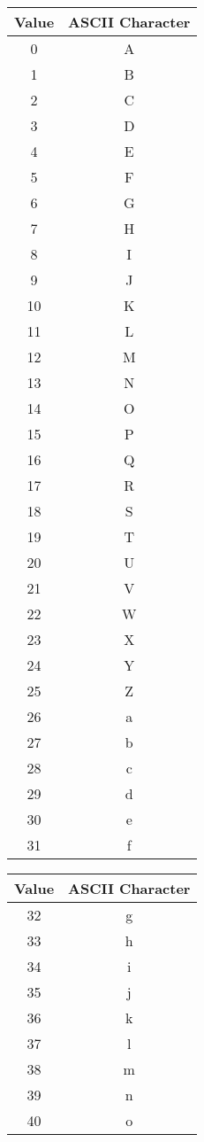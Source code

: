 \documentclass[12pt]{book}
\begin{document}
  {\ttfamily\begin{tabular}{c c}
    \hline
    Value & ASCII Character \\
    \hline
     0 & A \\
     1 & B \\
     2 & C \\
     3 & D \\
     4 & E \\
     5 & F \\
     6 & G \\
     7 & H \\
     8 & I \\
     9 & J \\
    10 & K \\
    11 & L \\
    12 & M \\
    13 & N \\
    14 & O \\
    15 & P \\
    16 & Q \\
    17 & R \\
    18 & S \\
    19 & T \\
    20 & U \\
    21 & V \\
    22 & W \\
    23 & X \\
    24 & Y \\
    25 & Z \\
    26 & a \\
    27 & b \\
    28 & c \\
    29 & d \\
    30 & e \\
    31 & f \\
  \end{tabular}
  \quad
  \begin{tabular}{c c}
    \hline
    Value & ASCII Character \\
    \hline
    32 & g \\
    33 & h \\
    34 & i \\
    35 & j \\
    36 & k \\
    37 & l \\
    38 & m \\
    39 & n \\
    40 & o \\

\end{tabular}}
\end{document}
